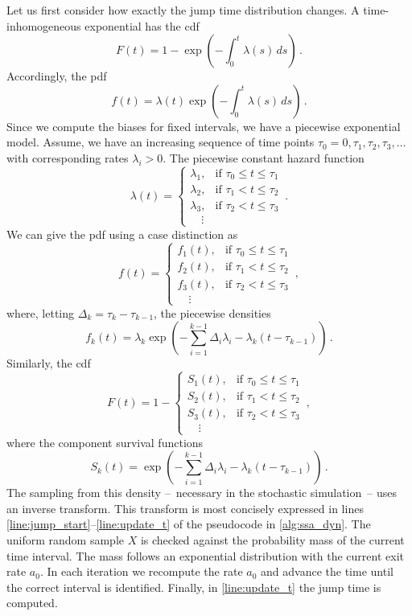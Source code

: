 Let us first consider how exactly the jump time distribution changes.
A time-inhomogeneous exponential has the cdf
\[
    F(t) = 1 - \exp\left(-\int_0^t \lambda(s)\,ds\right)\,.
\]
Accordingly, the pdf
\[
    f(t) = \lambda(t)\exp\left(-\int_0^t \lambda(s)\,ds\right)\,.
\]
Since we compute the biases for fixed intervals, we have a piecewise exponential model.
Assume, we have an increasing sequence of time points $\tau_0=0, \tau_1, \tau_2, \tau_3, \dots$ with corresponding rates $\lambda_i >0$.
The piecewise constant hazard function
\[
    \lambda(t) = \begin{cases}
        \lambda_1, & \text{if } \tau_0 \leq t \leq \tau_1\\
        \lambda_2, & \text{if } \tau_1 < t \leq \tau_2\\
        \lambda_3, & \text{if } \tau_2 < t \leq \tau_3\\
        \quad\vdots
    \end{cases}\,.
\]
We can give the pdf using a case distinction as
\begin{equation}
    f(t) = \begin{cases}
        f_1(t), & \text{if }\tau_0 \leq t \leq \tau_1\\
        f_2(t), & \text{if }\tau_1 < t \leq \tau_2\\
        f_3(t), & \text{if }\tau_2 < t \leq \tau_3\\
        \quad\vdots
    \end{cases}\,,
\end{equation}
where, letting $\Delta_k = \tau_k - \tau_{k-1}$, the piecewise densities
\[
    f_k(t) = \lambda_k \exp \left( -\sum_{i=1}^{k-1}\Delta_i\lambda_i - \lambda_k\left(t - \tau_{k-1}\right)\right)\,.
\]
Similarly, the cdf
\begin{equation}
    F(t) = 1 - \begin{cases}
        S_1(t), & \text{if }\tau_0 \leq t \leq \tau_1\\
        S_2(t), & \text{if }\tau_1 < t \leq \tau_2\\
        S_3(t), & \text{if }\tau_2 < t \leq \tau_3\\
        \quad\vdots
    \end{cases}\,,
\end{equation}
where the component survival functions
\[
    S_k(t) = \exp \left( -\sum_{i=1}^{k-1}\Delta_i\lambda_i - \lambda_k\left(t - \tau_{k-1}\right)\right)\,.
\]
The sampling from this density --~necessary in the stochastic simulation~-- uses an inverse transform.
This transform is most concisely expressed in lines \ref{line:jump_start}--\ref{line:update_t} of the pseudocode in \autoref{alg:ssa_dyn}.
The uniform random sample $X$ is checked against the probability mass of the current time interval.
The mass follows an exponential distribution with the current exit rate $a_0$.
In each iteration we recompute the rate $a_0$ and advance the time until the correct interval is identified.
Finally, in \autoref{line:update_t} the jump time is computed.

